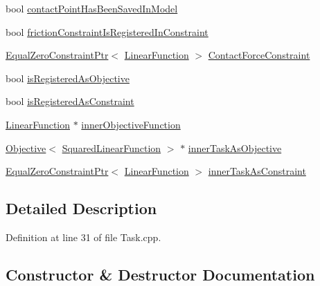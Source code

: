 \begin{DoxyCompactItemize}
\item 
bool \hyperlink{structocra_1_1Task_1_1Pimpl_a609e0fedd60809c80e0381eafd97063a}{contact\+Point\+Has\+Been\+Saved\+In\+Model}
\item 
bool \hyperlink{structocra_1_1Task_1_1Pimpl_aa23ba3a568d9e47f1a6157715a818285}{friction\+Constraint\+Is\+Registered\+In\+Constraint}
\item 
\hyperlink{classocra_1_1EqualZeroConstraintPtr}{Equal\+Zero\+Constraint\+Ptr}$<$ \hyperlink{classocra_1_1LinearFunction}{Linear\+Function} $>$ \hyperlink{structocra_1_1Task_1_1Pimpl_afd9210ed3a558a170e75a7033e9ce4d8}{Contact\+Force\+Constraint}
\item 
bool \hyperlink{structocra_1_1Task_1_1Pimpl_a15289fedace1e80a0999cec502b60d23}{is\+Registered\+As\+Objective}
\item 
bool \hyperlink{structocra_1_1Task_1_1Pimpl_ae028c89ba97335288e09cf823399f680}{is\+Registered\+As\+Constraint}
\item 
\hyperlink{classocra_1_1LinearFunction}{Linear\+Function} $\ast$ \hyperlink{structocra_1_1Task_1_1Pimpl_a1af1ebecf090dacfa6f25164857b2437}{inner\+Objective\+Function}
\item 
\hyperlink{classocra_1_1Objective}{Objective}$<$ \hyperlink{classocra_1_1SquaredLinearFunction}{Squared\+Linear\+Function} $>$ $\ast$ \hyperlink{structocra_1_1Task_1_1Pimpl_a8b5dfe1995ff26df2c0505195da5c305}{inner\+Task\+As\+Objective}
\item 
\hyperlink{classocra_1_1EqualZeroConstraintPtr}{Equal\+Zero\+Constraint\+Ptr}$<$ \hyperlink{classocra_1_1LinearFunction}{Linear\+Function} $>$ \hyperlink{structocra_1_1Task_1_1Pimpl_ae4b95f72f96a2740186e49920e7672ad}{inner\+Task\+As\+Constraint}
\end{DoxyCompactItemize}


\subsection{Detailed Description}


Definition at line 31 of file Task.\+cpp.



\subsection{Constructor \& Destructor Documentation}
\hypertarget{structocra_1_1Task_1_1Pimpl_a3d7faa7e6fa107d07e079823df57b07e}{}\label{structocra_1_1Task_1_1Pimpl_a3d7faa7e6fa107d07e079823df57b07e} 
